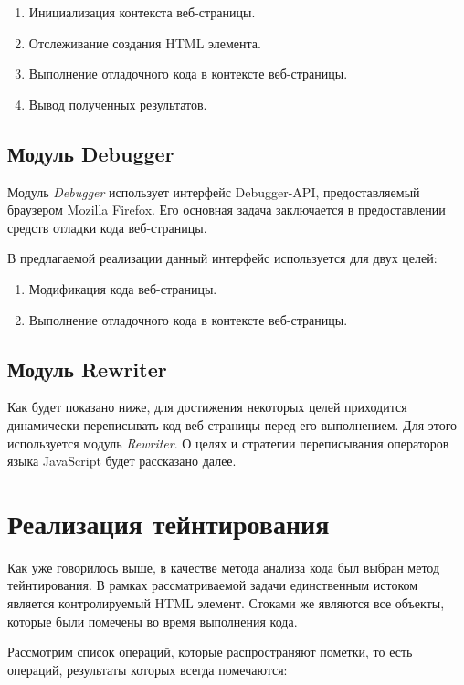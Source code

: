 	\bigskip
	\begin{enumerate}
		\item Инициализация контекста веб-страницы.
		\item Отслеживание создания HTML элемента.
		\item Выполнение отладочного кода в контексте веб-страницы.
		\item Вывод полученных результатов.
	\end{enumerate}

\subsection{Модуль Debugger}
	Модуль \textit{Debugger} использует интерфейс Debugger-API, предоставляемый браузером Mozilla Firefox. Его основная задача заключается в предоставлении средств отладки кода веб-страницы.


	В предлагаемой реализации данный интерфейс используется для двух целей:

	\bigskip
	\begin{enumerate}
		\item Модификация кода веб-страницы.
		\item Выполнение отладочного кода в контексте веб-страницы.
	\end{enumerate}

\subsection{Модуль Rewriter}
	Как будет показано ниже, для достижения некоторых целей приходится динамически переписывать код веб-страницы перед его выполнением. Для этого используется модуль \textit{Rewriter}. О целях и стратегии переписывания операторов языка JavaScript будет рассказано далее.

\section{Реализация тейнтирования}
Как уже говорилось выше, в качестве метода анализа кода был выбран метод тейнтирования. В рамках рассматриваемой задачи единственным истоком является контролируемый HTML элемент. Стоками же являются все объекты, которые были помечены во время выполнения кода.


Рассмотрим список операций, которые распространяют пометки, то есть операций, результаты которых всегда помечаются:

